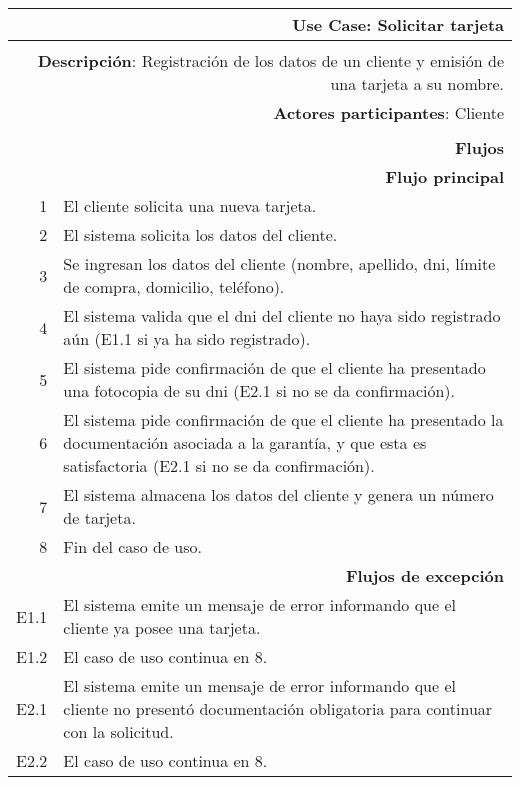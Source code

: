 \begin{tabularx}{\textwidth}{| r | X |}
\hline
\multicolumn{2}{|X|}{
\textbf{Use Case}: Solicitar tarjeta} \\

\hline
\multicolumn{2}{|c|}{\cellcolor[gray]{0.6}} \\

\hline
\multicolumn{2}{|X|}{
\textbf{Descripción}: Registración de los datos de un cliente y emisión de una
tarjeta a su nombre.} \\

\hline
\multicolumn{2}{|X|}{
\textbf{Actores participantes}: Cliente} \\

\hline
\multicolumn{2}{|c|}{\cellcolor[gray]{0.6} } \\

\hline
\multicolumn{2}{|X|}{
\textbf{Flujos}} \\

\hline
\multicolumn{2}{|X|}{
\textbf{Flujo principal}} \\

\hline
1 & El cliente solicita una nueva tarjeta. \\
\hline
2 & El sistema solicita los datos del cliente. \\
\hline
3 & Se ingresan los datos del cliente (nombre, apellido, dni, límite de compra,
domicilio, teléfono). \\
\hline
4 & El sistema valida que el dni del cliente no haya sido registrado aún (E1.1
si ya ha sido registrado). \\
\hline
5 & El sistema pide confirmación de que el cliente ha presentado una fotocopia
de su dni (E2.1 si no se da confirmación). \\
\hline
6 & El sistema pide confirmación de que el cliente ha presentado la
documentación asociada a la garantía, y que esta es satisfactoria (E2.1 si no se
da confirmación). \\
\hline
7 & El sistema almacena los datos del cliente y genera un número de tarjeta. \\
\hline
8 & Fin del caso de uso. \\

\hline
\multicolumn{2}{|X|}{
\textbf{Flujos de excepción}} \\

\hline
E1.1 & El sistema emite un mensaje de error informando que el cliente ya posee
una tarjeta. \\
\hline
E1.2 & El caso de uso continua en 8.\\

\hline
E2.1 & El sistema emite un mensaje de error informando que el cliente no
presentó documentación obligatoria para continuar con la solicitud. \\
\hline
E2.2 & El caso de uso continua en 8. \\

\hline
\end{tabularx}

